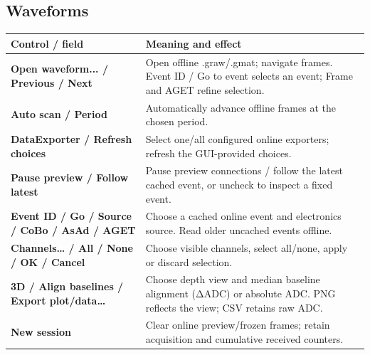 \documentclass[11pt,a4paper]{article}
\newcommand{\ui}[1]{\textbf{#1}}
\begin{document}
\subsection*{Waveforms}
\begin{tabularx}{\linewidth}{@{}L{58mm}Y@{}}\toprule
Control / field & Meaning and effect \\\midrule
\ui{Open waveform... / Previous / Next} & Open offline .graw/.gmat; navigate frames. Event ID / Go to event selects an event; Frame and AGET refine selection.\\
\ui{Auto scan / Period} & Automatically advance offline frames at the chosen period.\\
\ui{DataExporter / Refresh choices} & Select one/all configured online exporters; refresh the GUI-provided choices.\\
\ui{Pause preview / Follow latest} & Pause preview connections / follow the latest cached event, or uncheck to inspect a fixed event.\\
\ui{Event ID / Go / Source / CoBo / AsAd / AGET} & Choose a cached online event and electronics source. Read older uncached events offline.\\
\ui{Channels… / All / None / OK / Cancel} & Choose visible channels, select all/none, apply or discard selection.\\
\ui{3D / Align baselines / Export plot/data…} & Choose depth view and median baseline alignment (ΔADC) or absolute ADC. PNG reflects the view; CSV retains raw ADC.\\
\ui{New session} & Clear online preview/frozen frames; retain acquisition and cumulative received counters.\\
\bottomrule\end{tabularx}
\end{document}
